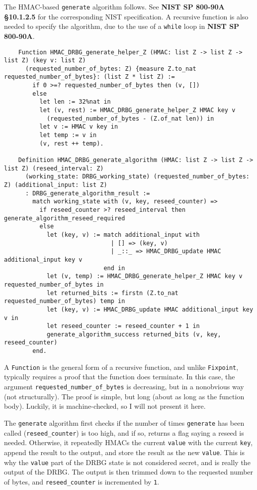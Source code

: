 \documentclass[pageno]{jpaper}
\newcommand{\stdtitle}[1]{\textbf{#1}}
\begin{document}
The HMAC-based \lstinline{generate} algorithm follows. See \stdtitle{NIST SP 800-90A \S 10.1.2.5} for the corresponding NIST specification. A recursive function is also needed to specify the algorithm, due to the use of a \lstinline{while} loop in \stdtitle{NIST SP 800-90A}.


\begin{lstlisting}
    Function HMAC_DRBG_generate_helper_Z (HMAC: list Z -> list Z -> list Z) (key v: list Z)
      (requested_number_of_bytes: Z) {measure Z.to_nat requested_number_of_bytes}: (list Z * list Z) :=
        if 0 >=? requested_number_of_bytes then (v, [])
        else
          let len := 32%nat in
          let (v, rest) := HMAC_DRBG_generate_helper_Z HMAC key v
            (requested_number_of_bytes - (Z.of_nat len)) in
          let v := HMAC v key in
          let temp := v in
          (v, rest ++ temp).

    Definition HMAC_DRBG_generate_algorithm (HMAC: list Z -> list Z -> list Z) (reseed_interval: Z)
      (working_state: DRBG_working_state) (requested_number_of_bytes: Z) (additional_input: list Z)
      : DRBG_generate_algorithm_result :=
        match working_state with (v, key, reseed_counter) =>
          if reseed_counter >? reseed_interval then generate_algorithm_reseed_required
          else
            let (key, v) := match additional_input with
                              | [] => (key, v)
                              | _::_ => HMAC_DRBG_update HMAC additional_input key v
                            end in
            let (v, temp) := HMAC_DRBG_generate_helper_Z HMAC key v requested_number_of_bytes in
            let returned_bits := firstn (Z.to_nat requested_number_of_bytes) temp in
            let (key, v) := HMAC_DRBG_update HMAC additional_input key v in
            let reseed_counter := reseed_counter + 1 in
            generate_algorithm_success returned_bits (v, key, reseed_counter)
        end.
\end{lstlisting}

A \lstinline{Function} is the general form of a recursive function, and unlike \lstinline{Fixpoint}, typically requires a proof that the function does terminate. In this case, the argument \lstinline{requested_number_of_bytes} is decreasing, but in a nonobvious way (not structurally). The proof is simple, but long (about as long as the function body). Luckily, it is machine-checked, so I will not present it here.

The \lstinline{generate} algorithm first checks if the number of times \lstinline{generate} has been called (\lstinline{reseed_counter}) is too high, and if so, returns a flag saying a reseed is needed. Otherwise, it repeatedly HMACs the current \lstinline{value} with the current \lstinline{key}, append the result to the output, and store the result as the new \lstinline{value}. This is why the \lstinline{value} part of the DRBG state is not considered secret, and is really the output of the DRBG. The output is then trimmed down to the requested number of bytes, and \lstinline{reseed_counter} is incremented by \lstinline{1}.
\end{document}
